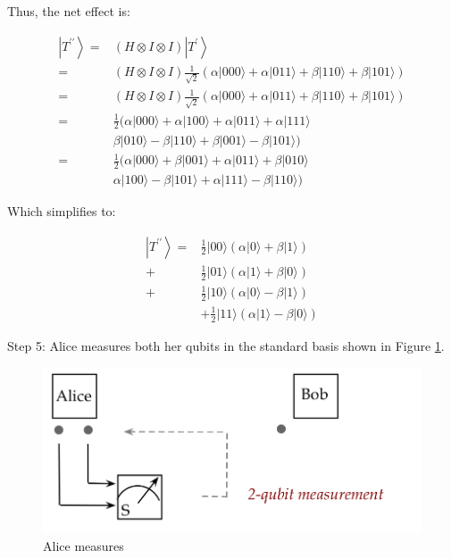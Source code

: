 \documentclass[main.tex]{subfiles}
\begin{document}
    Thus, the net effect is:
    
    $$
    \begin{aligned}
    \left|T^{\prime \prime}\right\rangle=&(H \otimes I \otimes I)\left|T^{\prime}\right\rangle \\
    =&(H \otimes I \otimes I) \frac{1}{\sqrt{2}}(\alpha|000\rangle+\alpha|011\rangle+\beta|110\rangle+\beta|101\rangle) \\
    =&(H \otimes I \otimes I) \frac{1}{\sqrt{2}}(\alpha|000\rangle+\alpha|011\rangle+\beta|110\rangle+\beta|101\rangle) \\
    =& \frac{1}{2}(\alpha|000\rangle+\alpha|100\rangle+\alpha|011\rangle+\alpha|111\rangle\\
    &\beta|010\rangle-\beta|110\rangle+\beta|001\rangle-\beta|101\rangle) \\
    =& \frac{1}{2}(\alpha|000\rangle+\beta|001\rangle+\alpha|011\rangle+\beta|010\rangle\\
    &\alpha|100\rangle-\beta|101\rangle+\alpha|111\rangle-\beta|110\rangle)
    \end{aligned}
    $$
    
    Which simplifies to:
    
    $$
    \begin{aligned}
    \left|T^{\prime \prime}\right\rangle=& \frac{1}{2}|00\rangle(\alpha|0\rangle+\beta|1\rangle) \\
    +& \frac{1}{2}|01\rangle(\alpha|1\rangle+\beta|0\rangle) \\
    +& \frac{1}{2}|10\rangle(\alpha|0\rangle-\beta|1\rangle) \\
    &+\frac{1}{2}|11\rangle(\alpha|1\rangle-\beta|0\rangle)
    \end{aligned}
    $$
    
    Step 5: Alice measures both her qubits in the standard basis shown in Figure \ref{fig:32teleport5}.
    
    \begin{figure}
        \centering
        \includegraphics[width=5in]{notes/figs/n07/32teleport5.png}
        \caption{Alice measures}
        \label{fig:32teleport5}
    \end{figure}
    
\end{document}
